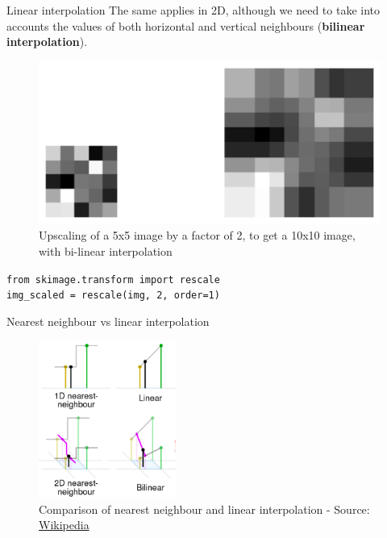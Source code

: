 \documentclass[9pt, aspectratio=169]{beamer}
\begin{document}
\begin{frame}
    {Linear interpolation}
    The same applies in 2D, although we need to take into accounts the values of both horizontal and vertical neighbours (\textbf{bilinear interpolation}).
    \begin{figure}
        \centering
        \includegraphics[width=.65\textwidth]{upscaling_lin_interpolation.png}
        \caption{Upscaling of a 5x5 image by a factor of 2, to get a 10x10 image, with bi-linear interpolation}
    \end{figure}

    \begin{codebox}
        \texttt{from skimage.transform import rescale\\
            \texttt{img\_scaled = rescale(}\texttt{img, 2, }order=1)}
    \end{codebox}
\end{frame}

\begin{frame}
    {Nearest neighbour vs linear interpolation}
    \begin{figure}

        \centering
        \includegraphics[width=0.4\textwidth]{interpolation schematics.png}
        \caption{Comparison of nearest neighbour and linear interpolation - Source: \href{https://en.wikipedia.org/wiki/Nearest-neighbor_interpolation}{Wikipedia}}
    \end{figure}
\end{frame}
\end{document}
